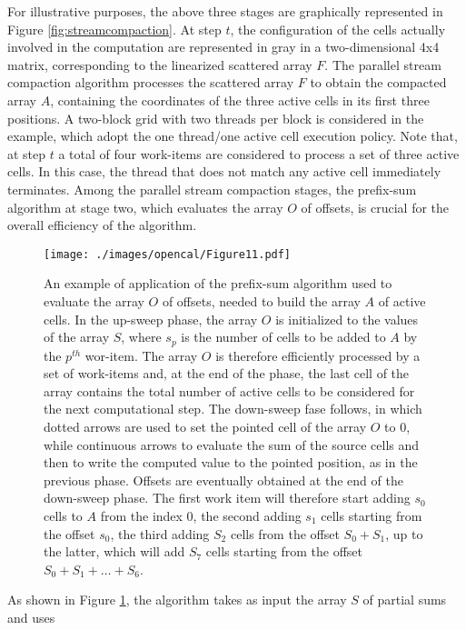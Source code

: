 For illustrative purposes, the above three stages are graphically
represented in Figure \ref{fig:streamcompaction}. At step $t$, the
configuration of the cells actually involved in the computation are
represented in gray in a two-dimensional 4x4 matrix, corresponding
to the linearized scattered array $F$. The parallel stream
compaction algorithm processes the scattered array $F$ to obtain the
compacted array $A$, containing the coordinates of the three active
cells in its first three positions. A two-block grid with two
threads per block is considered in the example, which adopt the one
thread/one active cell execution policy. Note that, at step $t$ a
total of four work-items are considered to process a set of three
active cells. In this case, the thread that does not match any
active cell immediately terminates. Among the parallel stream
compaction stages, the prefix-sum algorithm at stage two, which
evaluates the array $O$ of offsets, is crucial for the overall
efficiency of the algorithm. 
\begin{figure}
	\begin{center}
		\texttt{[image: ./images/opencal/Figure11.pdf]}
		\caption{An example of application of the prefix-sum algorithm used to evaluate the array $O$ of offsets, needed to build the array $A$ of active cells. In the up-sweep phase, the array $O$ is initialized to the
		values of the array $S$, where $s_p$ is the number of cells to be
		added to $A$ by the $p^{th}$ wor-item. The array $O$ is therefore
		efficiently processed by a set of work-items and, at the end of the
		phase, the last cell of the array contains the total number of active cells to be considered for the next computational step. The down-sweep fase follows, in which dotted arrows are used to set the pointed cell of the array $O$ to 0, while continuous arrows to evaluate the sum of the source cells and then to write the computed value to the pointed position, as in the previous phase. Offsets are eventually obtained at the end of the down-sweep phase. The first work item will therefore start adding $s_0$ cells to $A$ from the index 0, the second adding $s_1$ cells starting from the offset $s_0$, the third adding $S_2$ cells from the offset $S_0+S_1$, up to the latter, which will add $S_7$ cells starting from the offset $S_0+S_1+\ldots+S_6$.}
		\label{fig:prefixsum}
	\end{center}
\end{figure}
As shown in Figure \ref{fig:prefixsum},
the algorithm takes as input the array $S$ of partial sums and uses
